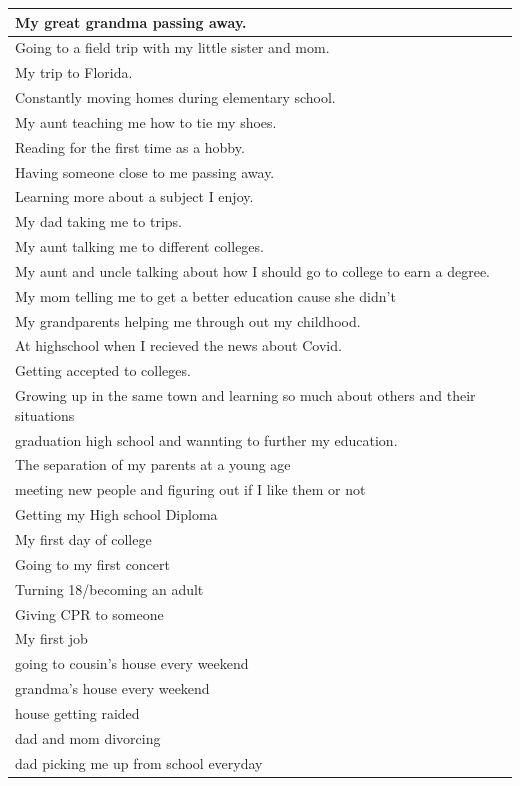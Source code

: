 \documentclass[
  .7em,
  letterpaper,
  DIV=11,
  numbers=noendperiod]{scrartcl}
\begin{document}
\begin{table}
\begin{tabular}{l}
\hline
My great grandma passing away.\\
\hline
Going to a field trip with my little sister and mom.\\
\hline
My trip to Florida.\\
\hline
Constantly moving homes during elementary school.\\
\hline
My aunt teaching me how to tie my shoes.\\
\hline
Reading for the first time as a hobby.\\
\hline
Having someone close to me passing away.\\
\hline
Learning more about a subject I enjoy.\\
\hline
My dad taking me to trips.\\
\hline
My aunt talking me to different colleges.\\
\hline
My aunt and uncle talking about how I should go to college to earn a degree.\\
\hline
My mom telling me to get a better education cause she didn't\\
\hline
My grandparents helping me through out my childhood.\\
\hline
At highschool when I recieved the news about Covid.\\
\hline
Getting accepted to colleges.\\
\hline
Growing up in the same town and learning so much about others and their situations\\
\hline
graduation high school and wannting to further my education.\\
\hline
The separation of my parents at a young age\\
\hline
meeting new people and figuring out if I like them or not\\
\hline
Getting my High school Diploma\\
\hline
My first day of college\\
\hline
Going to my first concert\\
\hline
Turning 18/becoming an adult\\
\hline
Giving CPR to someone\\
\hline
My first job\\
\hline
going to cousin's house every weekend\\
\hline
grandma's house every weekend\\
\hline
house getting raided\\
\hline
dad and mom divorcing\\
\hline
dad picking me up from school everyday\\

\end{tabular}
\end{table}
\end{document}
